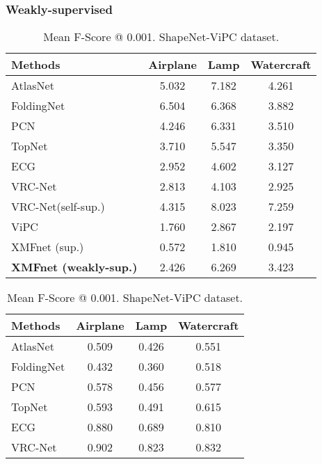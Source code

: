 \documentclass{article}
\begin{document}
\subsubsection{Weakly-supervised}

\begin{table}
\begin{minipage}{0.5\textwidth}
  \caption{Mean Chamfer Distance per point ($\times 10^{-3}$). ShapeNet-ViPC dataset.}
  \setlength\tabcolsep{1.3pt}
  \label{self-res}
\begin{tabular}{lccc}
\cmidrule(r){1-4}
    Methods & Airplane & Lamp & Watercraft \\
    \midrule
    \midrule
    AtlasNet \cite{atlas} & 5.032 & 7.182 & 4.261     \\
    FoldingNet \cite{folding} & 6.504  & 6.368 & 3.882  \\
    PCN \cite{pcn} &  4.246 & 6.331 & 3.510 \\  
    TopNet \cite{topnet}  & 3.710 & 5.547 & 3.350  \\
    ECG \cite{ecg} & 2.952 & 4.602 & 3.127 \\ 
    VRC-Net \cite{vrc} & 2.813 & 4.103 & 2.925 \\
    VRC-Net(self-sup.) & 4.315 & 8.023 & 7.259 \\
    ViPC  \cite{vipc} &  1.760 & 2.867 & 2.197 \\
    XMFnet (sup.) & 0.572 & 1.810 & 0.945 \\
    \midrule
   \textbf{XMFnet (weakly-sup.)} & 2.426 & 6.269 & 3.423\\
    \bottomrule
  \end{tabular}
\vspace{0.3cm}
  \caption{Mean F-Score @ 0.001. ShapeNet-ViPC dataset.}
  \setlength\tabcolsep{1.3pt}
  \label{self-res-f}
\begin{tabular}{lccc}
\cmidrule(r){1-4}
    Methods & Airplane & Lamp & Watercraft \\
    \midrule
    \midrule
    AtlasNet \cite{atlas} & 0.509 & 0.426 & 0.551     \\
    FoldingNet \cite{folding} & 0.432  & 0.360 & 0.518  \\
    PCN \cite{pcn} &  0.578 & 0.456 & 0.577 \\  
    TopNet \cite{topnet}  & 0.593 & 0.491 & 0.615  \\
    ECG \cite{ecg} & 0.880 & 0.689 & 0.810 \\ 
    VRC-Net \cite{vrc} & 0.902 & 0.823 & 0.832 \\

\end{tabular}
\end{minipage}
\end{table}
\end{document}
